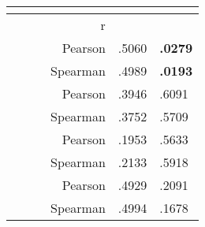 \begin{table}
    \centering
    \begin{ThreePartTable}
        
    \begin{tabularx}{\textwidth}{RRRR *{2}{A{2.3cm}}}
         \\
    \toprule
     &  &  & r &  &  \\  
    \midrule
     &  &  & Pearson & .5060 & \textbf{.0279} \\  
    &  &  & Spearman & .4989 & \textbf{.0193}   \\  
    \midrule
     &  &  & Pearson & .3946 & .6091 \\  
    &  &  & Spearman & .3752 & .5709 \\  
    \midrule
     &  &  & Pearson & .1953 & .5633 \\  
    &  &  & Spearman & .2133 & .5918 \\ 
    
     
     &  &  & Pearson & .4929 & .2091 \\  
    &  &  & Spearman & .4994 & .1678 \\  
    

\end{tabularx}
\end{ThreePartTable}
\end{table}
